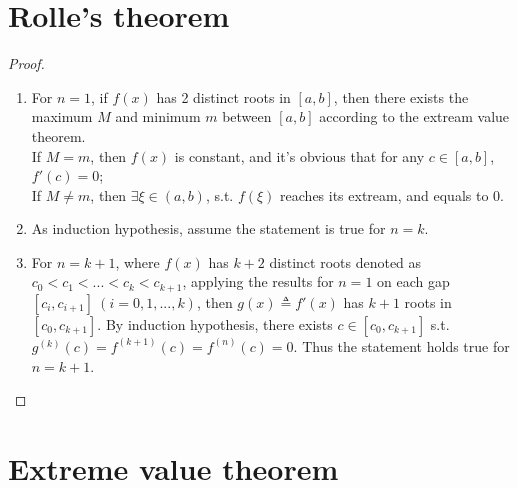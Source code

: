 \documentclass[paper=a4, fontsize=11pt]{scrartcl} %
\numberwithin{equation}{section} %
\numberwithin{figure}{section} %
\numberwithin{table}{section} %
\begin{document}

\section{Rolle's theorem}
	\begin{proof}
		\begin{enumerate}
			\item 
				For $n=1$, if $f(x)$ has 2 distinct roots in $[a, b]$, then there exists the maximum $M$ and minimum $m$ between $[a, b]$ according to the extream value theorem.\\
				If $M = m$, then $f(x)$ is constant, and it's obvious that for any $c \in [a, b]$, $f\prime(c) = 0$; \\
				If $M \neq m$, then $\exists \xi \in (a, b)$, s.t.  $f(\xi)$ reaches its extream, and equals to 0.
			\item
				As induction hypothesis, assume the statement is true for $n = k$.
			\item 
				For $n = k+1$, where $f(x)$ has $k+2$ distinct roots denoted as $c_0 < c_1 < ... <c_k < c_{k+1}$, applying the results for $n = 1$ on each gap $[c_i, c_{i+1}]\ (i = 0, 1, ... , k)$, then $g(x) \triangleq f'(x)$ has $k+1$ roots in $[c_0, c_{k+1}]$. By induction hypothesis, there exists $c \in [c_0, c_{k+1}]$ s.t. $g^{(k)}(c) = f^{(k+1)}(c) = f^{(n)}(c)= 0$. Thus the statement holds true for $n = k+1$.
		\end{enumerate}
	\end{proof}



\section{Extreme value theorem}
\end{document}
